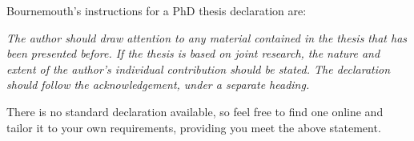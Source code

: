 

\begin{declaration}
Bournemouth's instructions for a PhD thesis declaration are:

\textit{The author should draw attention to any material contained in the thesis that has been presented before. If the thesis is based on joint research, the nature and extent of the author's individual contribution should be stated. The declaration should follow the acknowledgement, under a separate heading.}

There is no standard declaration available, so feel free to find one online and tailor it to your own requirements, providing you meet the above statement.

\end{declaration}
